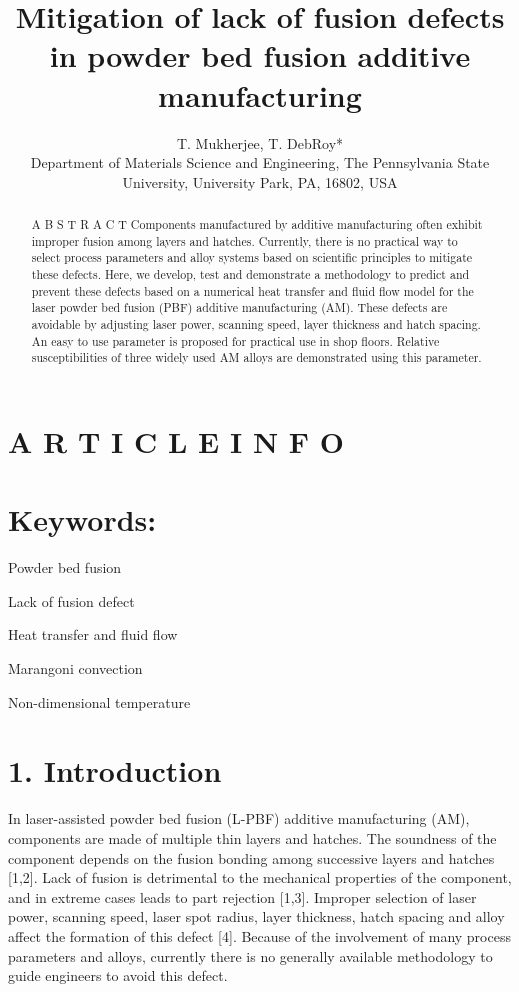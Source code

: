\documentclass[10pt]{article}
\title{Mitigation of lack of fusion defects in powder bed fusion additive manufacturing }
\author{T. Mukherjee, T. DebRoy*\\
Department of Materials Science and Engineering, The Pennsylvania State University, University Park, PA, 16802, USA}
\date{}
\begin{document}
\maketitle


\section*{A R T I C L E I N F O}
\section*{Keywords:}
Powder bed fusion

Lack of fusion defect

Heat transfer and fluid flow

Marangoni convection

Non-dimensional temperature

\begin{abstract}
A B S T R A C T Components manufactured by additive manufacturing often exhibit improper fusion among layers and hatches. Currently, there is no practical way to select process parameters and alloy systems based on scientific principles to mitigate these defects. Here, we develop, test and demonstrate a methodology to predict and prevent these defects based on a numerical heat transfer and fluid flow model for the laser powder bed fusion (PBF) additive manufacturing (AM). These defects are avoidable by adjusting laser power, scanning speed, layer thickness and hatch spacing. An easy to use parameter is proposed for practical use in shop floors. Relative susceptibilities of three widely used AM alloys are demonstrated using this parameter.
\end{abstract}

\section*{1. Introduction}
In laser-assisted powder bed fusion (L-PBF) additive manufacturing (AM), components are made of multiple thin layers and hatches. The soundness of the component depends on the fusion bonding among successive layers and hatches [1,2]. Lack of fusion is detrimental to the mechanical properties of the component, and in extreme cases leads to part rejection [1,3]. Improper selection of laser power, scanning speed, laser spot radius, layer thickness, hatch spacing and alloy affect the formation of this defect [4]. Because of the involvement of many process parameters and alloys, currently there is no generally available methodology to guide engineers to avoid this defect.
\end{document}
